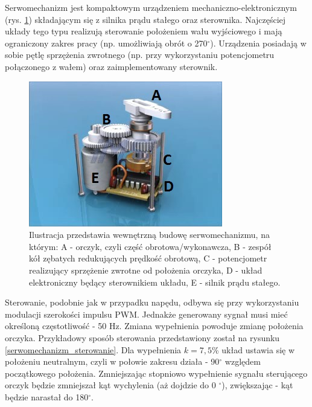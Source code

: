 Serwomechanizm jest kompaktowym urządzeniem mechaniczno-elektronicznym (rys. \ref{serwomechanizm}) składającym się z silnika prądu stałego oraz sterownika. Najczęściej układy tego typu realizują sterowanie położeniem wału wyjściowego i mają ograniczony zakres pracy (np. umożliwiają obrót o 270$^\circ$). Urządzenia posiadają w sobie pętlę sprzężenia zwrotnego (np. przy wykorzystaniu potencjometru połączonego z wałem) oraz zaimplementowany sterownik. 
  \begin{figure}[H]
    \begin{center}
      \includegraphics[scale=0.7]{imgs/serwo.jpg}
 	\caption[Model serwomechanizmu.]{\small{Ilustracja przedstawia wewnętrzną budowę serwomechanizmu, na którym: A - orczyk, czyli część obrotowa/wykonawcza, B - zespół kół zębatych redukujących prędkość obrotową, C - potencjometr realizujący sprzężenie zwrotne od położenia orczyka, D - układ elektroniczny będący sterownikiem układu, E - silnik prądu stałego.}\footnotemark}
	\label{serwomechanizm}
    \end{center}
  \end{figure}  
\noindent
Sterowanie, podobnie jak w przypadku napędu, odbywa się przy wykorzystaniu modulacji szerokości impulsu PWM. Jednakże generowany sygnał musi mieć określoną częstotliwość - 50 Hz. Zmiana wypełnienia powoduje zmianę położenia orczyka. Przykładowy sposób sterowania przedstawiony został na rysunku \ref{serwomechanizm_sterowanie}. Dla wypełnienia $k=7,5$\% układ ustawia się w położeniu neutralnym, czyli w połowie zakresu działa - 90$^\circ$ względem początkowego położenia. Zmniejszając stopniowo wypełnienie sygnału sterującego orczyk będzie zmniejszał kąt wychylenia (aż dojdzie do 0 $^\circ$), zwiększając - kąt będzie narastał do 180$^\circ$.

